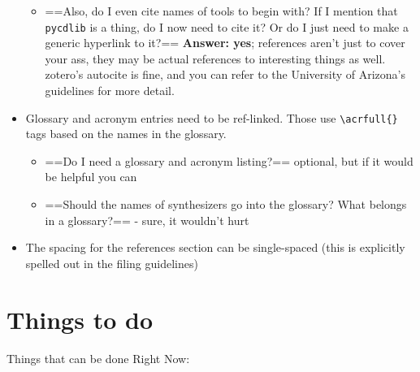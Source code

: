 \begin{itemize}
  \begin{itemize}
  \tightlist
  \item
    ==Also, do I even cite names of tools to begin with? If I mention
    that \passthrough{\lstinline!pycdlib!} is a thing, do I now need to
    cite it? Or do I just need to make a generic hyperlink to it?==
    \textbf{Answer: yes}; references aren't just to cover your ass, they
    may be actual references to interesting things as well. zotero's
    autocite is fine, and you can refer to the University of Arizona's
    guidelines for more detail.
  \end{itemize}
\item
  Glossary and acronym entries need to be ref-linked. Those use
  \passthrough{\lstinline!\\acrfull\{\}!} tags based on the names in the
  glossary.

  \begin{itemize}
  \tightlist
  \item
    ==Do I need a glossary and acronym listing?== optional, but if it
    would be helpful you can
  \item
    ==Should the names of synthesizers go into the glossary? What
    belongs in a glossary?== - sure, it wouldn't hurt
  \end{itemize}
\item
  The spacing for the references section can be single-spaced (this is
  explicitly spelled out in the filing guidelines)
\end{itemize}

\section{Things to do}\label{things-to-do}

Things that can be done Right Now:

